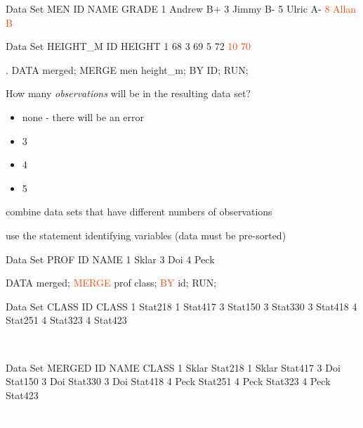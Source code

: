 \begin{frame}[fragile]
\footnotesize
\begin{craw}{.1}{Data Set MEN}
ID   NAME     GRADE
1    Andrew   B+
3    Jimmy    B-
5    Ulric    A-
\textcolor{OrangeRed}{8    Allan    B}
\end{craw}
\begin{craw}{.1}{Data Set HEIGHT\_M}
ID HEIGHT
1  68
3  69
5  72
\textcolor{OrangeRed}{10 70}
\end{craw}
\vspace{.0in}
\emp
{}
\begin{code}{.}
DATA merged;
   MERGE men height\_m;
   BY ID;
RUN;
\end{code}
\begin{clicker}{How many \emph{observations} will be in the resulting data set?}
\begin{itemize}
\item[0.] none - there will be an error
\item[3.] 3
\item[4.] 4
\item[5.] 5
\end{itemize}
\end{clicker}
\emp
\vspace{.0in}
\end{frame}



\begin{frame}[fragile]
\bi
\item[Goal:] combine data sets that have different numbers of observations
\item[How:] use the  statement  identifying variables (data must be pre-sorted)
\ei
{}
\footnotesize
\begin{craw}{.0}{Data Set PROF}
ID   NAME
1    Sklar
3    Doi
4    Peck
\end{craw}

\begin{code}{.0}
DATA merged;
   \textcolor{OrangeRed}{MERGE} prof class;
   \textcolor{OrangeRed}{BY} id;
RUN;
\end{code}
\emp
{} \hspace{0.05in} \emp
{}
\begin{craw}{.0}{Data Set CLASS}
ID CLASS
1  Stat218
1  Stat417
3  Stat150
3  Stat330
3  Stat418
4  Stat251
4  Stat323
4  Stat423
\end{craw}
\vskip25pt
\textcolor{White}{x}
\emp
{} \hspace{0.05in} \emp
{}
\begin{craw}{.0}{Data Set MERGED}
ID  NAME   CLASS
1   Sklar  Stat218
1   Sklar  Stat417
3   Doi    Stat150
3   Doi    Stat330
3   Doi    Stat418
4   Peck   Stat251
4   Peck   Stat323
4   Peck   Stat423
\end{craw}
\vskip25pt
\textcolor{White}{x}
\emp
\end{frame}


